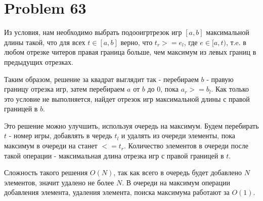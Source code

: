\documentclass[a4paper,12pt]{article}
\begin{document}
\section{Problem 63}

Из условия, нам необходимо выбрать подооигртрезок игр $[a, b]$ максимальной длины такой, что для всех $t \in [a, b]$ верно, что $t_r >= e_l$, где $e \in [a, t)$, т.e. в любом отрезке читеров правая граница больше, чем максимум из левых границ в предыдущих отрезках.

Таким образом, решение за квадрат выглядит так - перебираем $b$ - правую границу отрезка игр, затем перебираем $a$ от $b$ до 0, пока $a_r >= b_l$. Как только это условие не выполняется, найдет отрезок игр максимальной длины с правой границей в $b$. 

Это решение можно улучшить, используя очередь на максимум. Будем перебирать $t$ - номер игры, добавлять в чередь $t_l$ и удалять из очереди элементы, пока максимум в очереди на станет $<= t_r$. Количество элементов в очереди после такой операции - максимальная длина отрезка игр с правой границей в $t$.

Сложность такого решения $O(N)$, так как всего в очередь будет добавлено $N$ элементов, значит удалено не более $N$. В очереди на максимум операции добавления элемента, удаления элемента, поиска максимума работают за $O(1)$.
\end{document}
